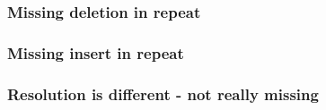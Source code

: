 \documentclass{beamer}
\begin{document}
\begin{frame}
\frametitle{Missing deletion in repeat}
\end{frame}

\begin{frame}
\frametitle{Missing insert in repeat}
\end{frame}

\begin{frame}
\frametitle{Resolution is different - not really missing}
\end{frame}
\end{document}
